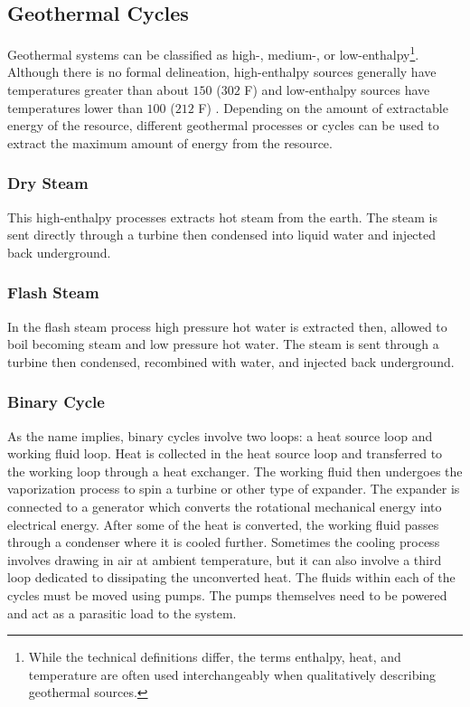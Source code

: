 \subsection{Geothermal Cycles}
Geothermal systems can be classified as high-, medium-, or low-enthalpy\footnote{While the technical definitions differ, the terms enthalpy, heat, and temperature are often used interchangeably when qualitatively describing geothermal sources.}. Although there is no formal delineation, high-enthalpy sources generally have temperatures greater than about $150$ \textcelsius{} ($302$ \textdegree{}F) and low-enthalpy sources have temperatures lower than $100$ \textcelsius{} ($212$ \textdegree{}F) \cite{Norden2011}. Depending on the amount of extractable energy of the resource, different geothermal processes or cycles can be used to extract the maximum amount of energy from the resource.

\subsubsection{Dry Steam}
This high-enthalpy processes extracts hot steam from the earth. The steam is sent directly through a turbine then condensed into liquid water and injected back underground. 

\subsubsection{Flash Steam} 
In the flash steam process high pressure hot water is extracted then, allowed to boil becoming steam and low pressure hot water. The steam is sent through a turbine then condensed, recombined with water, and injected back underground.

\subsubsection{Binary Cycle} 
As the name implies, binary cycles involve two loops: a heat source loop and working fluid loop. Heat is collected in the heat source loop and transferred to the working loop through a heat exchanger. The working fluid then undergoes the vaporization process to spin a turbine or other type of expander. The expander is connected to a generator which converts the rotational mechanical energy into electrical energy. After some of the heat is converted, the working fluid passes through a condenser where it is cooled further. Sometimes the cooling process involves drawing in air at ambient temperature, but it can also involve a third loop dedicated to dissipating the unconverted heat. The fluids within each of the cycles must be moved using pumps. The pumps themselves need to be powered and act as a parasitic load to the system.

